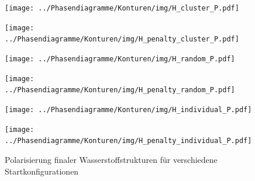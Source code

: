 \documentclass[a4paper, 10pt, twoside, openany]{book} %
\begin{document}
	\begin{figure}
		\begin{minipage}[t]{0.48\textwidth}
			\texttt{[image: ../Phasendiagramme/Konturen/img/H\_cluster\_P.pdf]}
			\label{H_cluster_P}
		\end{minipage}
		\hfill
		\begin{minipage}[t]{0.48\textwidth}
			\texttt{[image: ../Phasendiagramme/Konturen/img/H\_penalty\_cluster\_P.pdf]}
			\label{H_penalty_cluster_P}
		\end{minipage}
		\begin{minipage}[t]{0.48\textwidth}
			\texttt{[image: ../Phasendiagramme/Konturen/img/H\_random\_P.pdf]}
			\label{H_random_P}
		\end{minipage}
		\hfill
		\begin{minipage}[t]{0.48\textwidth}
			\texttt{[image: ../Phasendiagramme/Konturen/img/H\_penalty\_random\_P.pdf]}
			\label{H_penalty_random_P}
		\end{minipage}
		\begin{minipage}[t]{0.48\textwidth}
			\texttt{[image: ../Phasendiagramme/Konturen/img/H\_individual\_P.pdf]}
			\label{H_individual_P}
		\end{minipage}
		\hfill
		\begin{minipage}[t]{0.48\textwidth}
			\texttt{[image: ../Phasendiagramme/Konturen/img/H\_penalty\_individual\_P.pdf]}
			\label{H_penalty_individual_P}
		\end{minipage}
		\caption[Polarisierung finaler Wasserstoffstrukturen]{Polarisierung finaler Wasserstoffstrukturen für verschiedene Startkonfigurationen}
		\label{H_P}
	\end{figure}
	
\end{document}

